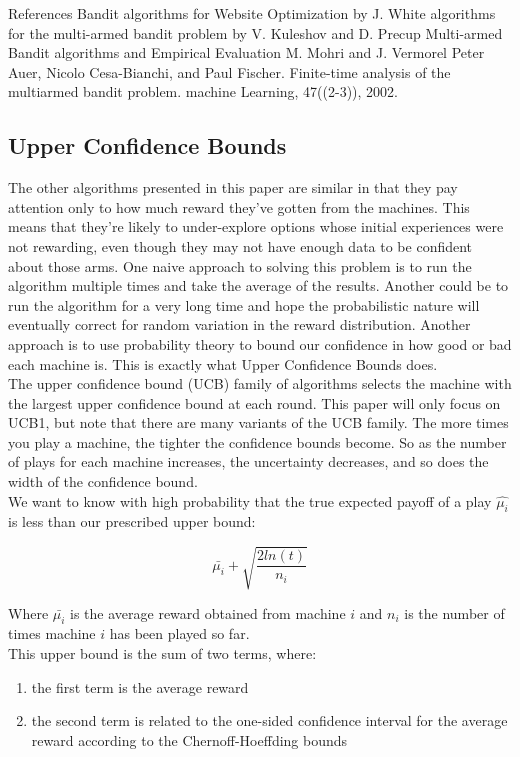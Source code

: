 \documentclass{article}
\begin{document}
References
Bandit algorithms for Website Optimization by J. White
algorithms for the multi-armed bandit problem by V. Kuleshov and D. Precup
Multi-armed Bandit algorithms and Empirical Evaluation M. Mohri and J. Vermorel
Peter Auer, Nicolo Cesa-Bianchi, and Paul Fischer. Finite-time analysis of the multiarmed bandit problem. machine Learning, 47((2-3)), 2002.

\subsection{Upper Confidence Bounds}

The other algorithms presented in this paper are similar in that they pay attention only to how much reward they’ve gotten from the machines. This means that they're likely to under-explore options whose initial experiences were not rewarding, even though they may not have enough data to be confident about those arms. One naive approach to solving this problem is to run the algorithm multiple times and take the average of the results. Another could be to run the algorithm for a very long time and hope the probabilistic nature will eventually correct for random variation in the reward distribution. Another approach is to use probability theory to bound our confidence in how good or bad each machine is. This is exactly what Upper Confidence Bounds does.\\

The upper confidence bound (UCB) family of algorithms selects the machine with the largest upper confidence bound at each round. This paper will only focus on UCB1, but note that there are many variants of the UCB family. The more times you play a machine, the tighter the confidence bounds become. So as the number of plays for each machine increases, the uncertainty decreases, and so does the width of the confidence bound.\\

We want to know with high probability that the true expected payoff of a play $\hat{\mu_i}$ is less than our prescribed upper bound:

$$\bar{\mu_{i}} + \sqrt{\frac{2 ln (t)}{n_i}}$$

Where $\bar{\mu_{i}}$ is the average reward obtained from machine $i$ and $n_i$ is the number of times machine $i$ has been played so far.\\

This upper bound is the sum of two terms, where:

\begin{enumerate}
\item the first term is the average reward
\item the second term is related to the one-sided confidence interval for the average reward according to the Chernoff-Hoeffding bounds
\end{enumerate}
\end{document}
